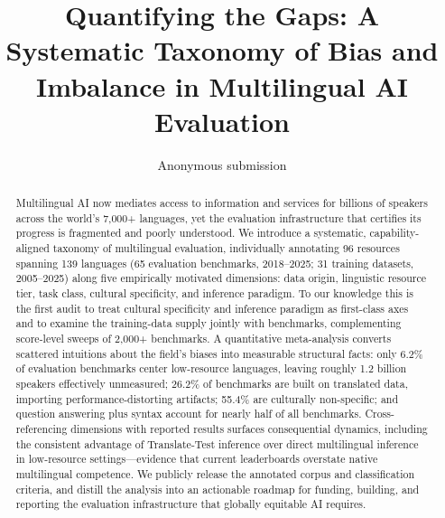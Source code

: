 \documentclass[letterpaper]{article} %
\title{Quantifying the Gaps: A Systematic Taxonomy of Bias and Imbalance in Multilingual AI Evaluation}
\author{Anonymous submission}
\begin{document}
\maketitle

\begin{abstract}
Multilingual AI now mediates access to information and services for billions of speakers across the world's 7{,}000+ languages, yet the evaluation infrastructure that certifies its progress is fragmented and poorly understood. We introduce a systematic, capability-aligned taxonomy of multilingual evaluation, individually annotating 96 resources spanning 139 languages (65 evaluation benchmarks, 2018--2025; 31 training datasets, 2005--2025) along five empirically motivated dimensions: data origin, linguistic resource tier, task class, cultural specificity, and inference paradigm. To our knowledge this is the first audit to treat cultural specificity and inference paradigm as first-class axes and to examine the training-data supply jointly with benchmarks, complementing score-level sweeps of 2{,}000+ benchmarks. A quantitative meta-analysis converts scattered intuitions about the field's biases into measurable structural facts: only 6.2\% of evaluation benchmarks center low-resource languages, leaving roughly 1.2 billion speakers effectively unmeasured; 26.2\% of benchmarks are built on translated data, importing performance-distorting artifacts; 55.4\% are culturally non-specific; and question answering plus syntax account for nearly half of all benchmarks. Cross-referencing dimensions with reported results surfaces consequential dynamics, including the consistent advantage of Translate-Test inference over direct multilingual inference in low-resource settings---evidence that current leaderboards overstate native multilingual competence. We publicly release the annotated corpus and classification criteria, and distill the analysis into an actionable roadmap for funding, building, and reporting the evaluation infrastructure that globally equitable AI requires.
\end{abstract}
\end{document}
